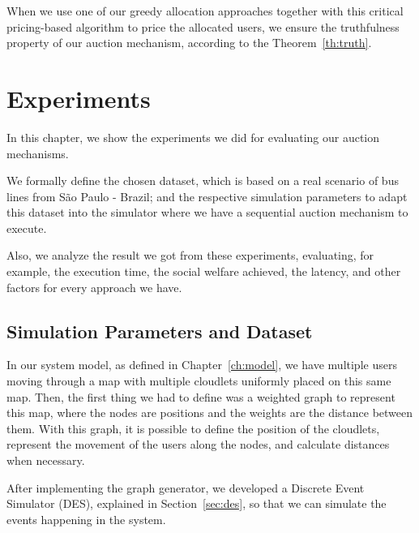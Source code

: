 \documentclass[English]{ic-tese-v3}
\begin{document}
When we use one of our greedy allocation approaches together with this critical pricing-based algorithm to price the allocated users, we ensure the truthfulness property of our auction mechanism, according to the Theorem~\ref{th:truth}.

\chapter{Experiments}
\label{ch:experiments}
In this chapter, we show the experiments we did for evaluating our auction mechanisms. 

We formally define the chosen dataset, which is based on a real scenario of bus lines from São Paulo - Brazil; and the respective simulation parameters to adapt this dataset into the simulator where we have a sequential auction mechanism to execute.

Also, we analyze the result we got from these experiments, evaluating, for example, the execution time, the social welfare achieved, the latency, and other factors for every approach we have.

\section{Simulation Parameters and Dataset}
\label{sec:sim_parameters}
In our system model, as defined in Chapter~\ref{ch:model}, we have multiple users moving through a map with multiple cloudlets uniformly placed on this same map. Then, the first thing we had to define was a weighted graph to represent this map, where the nodes are positions and the weights are the distance between them. With this graph, it is possible to define the position of the cloudlets, represent the movement of the users along the nodes, and calculate distances when necessary.

After implementing the graph generator, we developed a Discrete Event Simulator (DES), explained in Section~\ref{sec:des}, so that we can simulate the events happening in the system. 
\end{document}
